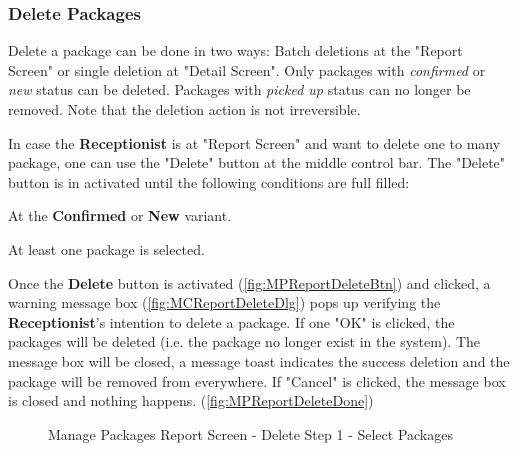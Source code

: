 \subsubsection{Delete Packages}

Delete a package can be done in two ways: Batch deletions at the "Report Screen" or single deletion at "Detail Screen". Only packages with \textit{confirmed} or \textit{new} status can be deleted. Packages with \textit{picked up} status can no longer be removed. Note that the deletion action is not irreversible.

\bigskip
In case the \textbf{Receptionist} is at "Report Screen" and want to delete one to many package, one can use the "Delete" button at the middle control bar. The "Delete" button is in activated until the following conditions are full filled:

\begin{compactenum}
    \item At the \textbf{Confirmed} or \textbf{New} variant.
    \item At least one package is selected.
\end{compactenum}

\bigskip
Once the \textbf{Delete} button is activated (\autoref{fig:MPReportDeleteBtn}) and clicked, a warning message box (\autoref{fig:MCReportDeleteDlg}) pops up verifying the \textbf{Receptionist}'s intention to delete a package. If one "OK" is clicked, the packages will be deleted (i.e. the package no longer exist in the system). The message box will be closed, a message toast indicates the success deletion and the package will be removed from everywhere. If "Cancel" is clicked, the message box is closed and nothing happens. (\autoref{fig:MPReportDeleteDone})

\begin{figure}[H]
	\centering

    \caption{Manage Packages Report Screen - Delete Step 1 - Select Packages}
	\label{fig:MPReportDeleteBtn}
\end{figure}

